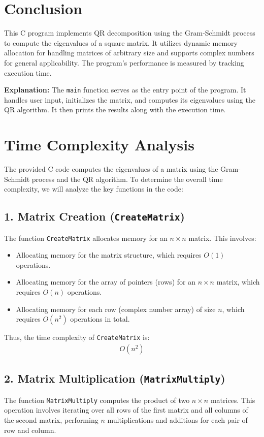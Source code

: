 \documentclass[article]{IEEEtran}
\numberwithin{equation}{enumi}
\numberwithin{figure}{enumi}
\begin{document}
\section*{Conclusion}
This C program implements QR decomposition using the Gram-Schmidt process to compute the eigenvalues of a square matrix. It utilizes dynamic memory allocation for handling matrices of arbitrary size and supports complex numbers for general applicability. The program's performance is measured by tracking execution time.

\textbf{Explanation:} 
The \texttt{main} function serves as the entry point of the program. It handles user input, initializes the matrix, and computes its eigenvalues using the QR algorithm. It then prints the results along with the execution time.


\section*{Time Complexity Analysis}

The provided C code computes the eigenvalues of a matrix using the Gram-Schmidt process and the QR algorithm. To determine the overall time complexity, we will analyze the key functions in the code:

\subsection*{1. Matrix Creation (\texttt{CreateMatrix})}
The function \texttt{CreateMatrix} allocates memory for an $n \times n$ matrix. This involves:

\begin{itemize}
    \item Allocating memory for the matrix structure, which requires $O(1)$ operations.
    \item Allocating memory for the array of pointers (rows) for an $n \times n$ matrix, which requires $O(n)$ operations.
    \item Allocating memory for each row (complex number array) of size $n$, which requires $O(n^2)$ operations in total.
\end{itemize}

Thus, the time complexity of \texttt{CreateMatrix} is:
\begin{align*}
O(n^2)
\end{align*}

\subsection*{2. Matrix Multiplication (\texttt{MatrixMultiply})}
The function \texttt{MatrixMultiply} computes the product of two $n \times n$ matrices. This operation involves iterating over all rows of the first matrix and all columns of the second matrix, performing $n$ multiplications and additions for each pair of row and column.
\end{document}
